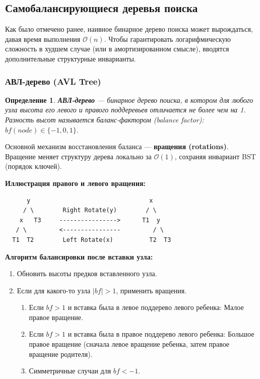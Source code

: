 \documentclass[12pt,a4paper]{article}
\newtheorem{definition}{Определение}
\begin{document}
\subsection{Самобалансирующиеся деревья поиска}

Как было отмечено ранее, наивное бинарное дерево поиска может вырождаться, давая время выполнения $\mathcal{O}(n)$. Чтобы гарантировать логарифмическую сложность в худшем случае (или в амортизированном смысле), вводятся дополнительные структурные инварианты.

\subsubsection{АВЛ-дерево (AVL Tree)}
\begin{definition}
\textbf{АВЛ-дерево} — бинарное дерево поиска, в котором для любого узла высота его левого и правого поддеревьев отличается не более чем на 1. Разность высот называется баланс-фактором (balance factor): $bf(node) \in \{-1, 0, 1\}$.
\end{definition}

Основной механизм восстановления баланса — \textbf{вращения (rotations)}. Вращение меняет структуру дерева локально за $\mathcal{O}(1)$, сохраняя инвариант BST (порядок ключей).

\textbf{Иллюстрация правого и левого вращения:}
\begin{verbatim}
      y                                 x
     / \        Right Rotate(y)        / \
    x   T3     ---------------->      T1  y
   / \         <----------------         / \
  T1  T2        Left Rotate(x)          T2  T3
\end{verbatim}

\textbf{Алгоритм балансировки после вставки узла:}
\begin{enumerate}
    \item Обновить высоты предков вставленного узла.
    \item Если для какого-то узла $|bf| > 1$, применить вращения.
    \begin{enumerate}
        \item Если $bf > 1$ и вставка была в левое поддерево левого ребенка: Малое правое вращение.
        \item Если $bf > 1$ и вставка была в правое поддерево левого ребенка: Большое правое вращение (сначала левое вращение ребенка, затем правое вращение родителя).
        \item Симметричные случаи для $bf < -1$.
    \end{enumerate}
\end{enumerate}
\end{document}
